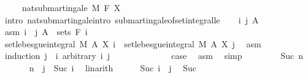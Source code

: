 \begin{isabellebody}
\ \ \ \ \ {\isachardoublequoteopen}nat{\isacharunderscore}{\kern0pt}submartingale\ M\ F\ X{\isachardoublequoteclose}\isanewline
%
\isadelimproof
%
\endisadelimproof
%
\isatagproof
{}\isamarkupfalse%
\ {\isacharparenleft}{\kern0pt}intro\ nat{\isacharunderscore}{\kern0pt}submartingale{\isachardot}{\kern0pt}intro\ submartingale{\isacharunderscore}{\kern0pt}of{\isacharunderscore}{\kern0pt}set{\isacharunderscore}{\kern0pt}integral{\isacharunderscore}{\kern0pt}le{\isacharparenright}{\kern0pt}\isanewline
\ \ \isamarkupfalse%
\ i\ j\ A\ \isamarkupfalse%
\ asm{\isacharcolon}{\kern0pt}\ {\isachardoublequoteopen}i\ {\isasymle}\ j{\isachardoublequoteclose}\ {\isachardoublequoteopen}A\ {\isasymin}\ sets\ {\isacharparenleft}{\kern0pt}F\ i{\isacharparenright}{\kern0pt}{\isachardoublequoteclose}\isanewline
\ \ \isamarkupfalse%
\ {\isachardoublequoteopen}set{\isacharunderscore}{\kern0pt}lebesgue{\isacharunderscore}{\kern0pt}integral\ M\ A\ {\isacharparenleft}{\kern0pt}X\ i{\isacharparenright}{\kern0pt}\ {\isasymle}\ set{\isacharunderscore}{\kern0pt}lebesgue{\isacharunderscore}{\kern0pt}integral\ M\ A\ {\isacharparenleft}{\kern0pt}X\ j{\isacharparenright}{\kern0pt}{\isachardoublequoteclose}\ \isamarkupfalse%
\ asm\isanewline
\ \ \isamarkupfalse%
\ {\isacharparenleft}{\kern0pt}induction\ {\isachardoublequoteopen}j\ {\isacharminus}{\kern0pt}\ i{\isachardoublequoteclose}\ arbitrary{\isacharcolon}{\kern0pt}\ i\ j{\isacharparenright}{\kern0pt}\isanewline
\ \ \ \ \isamarkupfalse%
\ {}\isanewline
\ \ \ \ \isamarkupfalse%
\ \isamarkupfalse%
\ {\isacharquery}{\kern0pt}case\ \isamarkupfalse%
\ asm\ \isamarkupfalse%
\ simp\isanewline
\ \ \isamarkupfalse%
\isanewline
\ \ \ \ \isamarkupfalse%
\ {\isacharparenleft}{\kern0pt}Suc\ n{\isacharparenright}{\kern0pt}\isanewline
\ \ \ \ \isamarkupfalse%
\ {\isacharasterisk}{\kern0pt}{\isacharcolon}{\kern0pt}\ {\isachardoublequoteopen}n\ {\isacharequal}{\kern0pt}\ j\ {\isacharminus}{\kern0pt}\ Suc\ i{\isachardoublequoteclose}\ \isamarkupfalse%
\ linarith\isanewline
\ \ \ \ \isamarkupfalse%
\ {\isachardoublequoteopen}Suc\ i\ {\isasymle}\ j{\isachardoublequoteclose}\ \isamarkupfalse%
\ Suc{\isacharparenleft}{\kern0pt}{}{\isacharcomma}{\kern0pt}{}{\isacharparenright}{\kern0pt}\ \isamarkupfalse%

\end{isabellebody}
